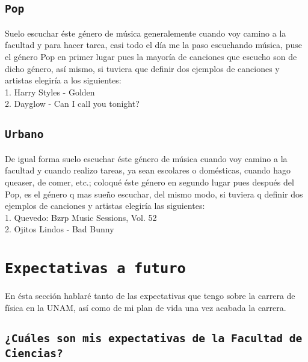 \documentclass[12pt, letterpaper]{article}
\begin{document}
    \subsection{\tt{\large{Pop}}}
    
    \small{
    Suelo escuchar éste género de música generalemente cuando voy camino a la facultad y para hacer tarea, casi todo el día me la paso escuchando música, puse el género Pop en primer lugar pues la mayoría de canciones que escucho son de dicho género, así mismo, si tuviera que definir dos ejemplos de canciones y artistas elegiría a los siguientes: \\
    
    1. Harry Styles - Golden \\
    
    2. Dayglow - Can I call you tonight?
    }
    
    \subsection{\tt{\large{Urbano}}}
    
    \small{
    De igual forma suelo escuchar éste género de música cuando voy camino a la facultad y cuando realizo tareas, ya sean escolares o domésticas, cuando hago queaser, de comer, etc.; coloqué éste género en segundo lugar pues después del Pop, es el género q mas sueño escuchar, del mismo modo, si tuviera q definir dos ejemplos de canciones y artistas elegiría las siguientes: \\
    
    1. Quevedo: Bzrp Music Sessions, Vol. 52 \\

    2. Ojitos Lindos - Bad Bunny \\
    }


\section{\tt{\LARGE{Expectativas a futuro}}}

\normalsize{
En ésta sección hablaré tanto de las expectativas que tengo sobre la carrera de física en la UNAM, así como de mi plan de vida una vez acabada la carrera.
}

    \subsection{\tt{\large{¿Cuáles son mis expectativas de la Facultad de Ciencias?}}}
    
\end{document}
